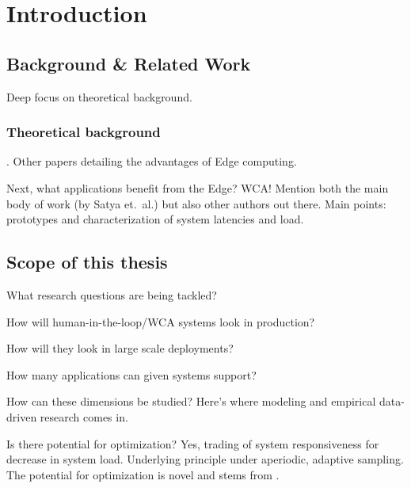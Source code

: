 \chapter{Introduction}

\section{Background \& Related Work}

Deep focus on theoretical background.

\subsection{Theoretical background}
\textcite{Satya2009Case}.
Other papers detailing the advantages of Edge computing.

Next, what applications benefit from the Edge?
\ac{WCA}! Mention both the main body of work (by Satya et.\ al.) but also other authors out there.
Main points: prototypes and characterization of system latencies and load.


\section{Scope of this thesis}

What research questions are being tackled?

How will human-in-the-loop/\ac{WCA} systems look in production?

How will they look in large scale deployments?

How many applications can given systems support?

How can these dimensions be studied?
Here's where modeling and empirical data-driven research comes in.

Is there potential for optimization?
Yes, trading of system responsiveness for decrease in system load.
Underlying principle under aperiodic, adaptive sampling.
The potential for optimization is novel and stems from \textcite{Olguin:ImpactWCA2021}.
